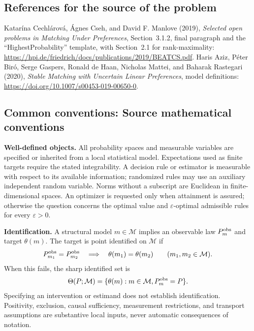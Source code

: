 \documentclass[11pt,a4paper]{article}
\begin{document}
\subsection*{References for the source of the problem}
Katar\'ina Cechl\'arov\'a, \'Agnes Cseh, and David F. Manlove (2019), \emph{Selected open problems in Matching Under Preferences}, Section~3.1.2, final paragraph and the ``HighestProbability'' template, with Section~2.1 for rank-maximality: \url{https://hpi.de/friedrich/docs/publications/2019/BEATCS.pdf}. Haris Aziz, P\'eter Bir\'o, Serge Gaspers, Ronald de Haan, Nicholas Mattei, and Baharak Rastegari (2020), \emph{Stable Matching with Uncertain Linear Preferences}, model definitions: \url{https://doi.org/10.1007/s00453-019-00650-0}.

\subsection*{Common conventions: Source mathematical conventions}

\textbf{Well-defined objects.}
All probability spaces and measurable variables are specified or inherited
from a local statistical model. Expectations used as finite targets require
the stated integrability. A decision rule or estimator is measurable with
respect to its available information; randomized rules may use an auxiliary
independent random variable. Norms without a subscript are Euclidean in
finite-dimensional spaces. An optimizer is requested only when attainment
is assured; otherwise the question concerns the optimal value and
$\varepsilon$-optimal admissible rules for every $\varepsilon>0$.

\textbf{Identification.}
A structural model $m\in\mathcal M$ implies an observable law
$P_m^{\rm obs}$ and target $\theta(m)$. The target is point identified on
$\mathcal M$ if
\[
 P_{m_1}^{\rm obs}=P_{m_2}^{\rm obs}
 \quad\Longrightarrow\quad\theta(m_1)=\theta(m_2)
 \qquad(m_1,m_2\in\mathcal M).
\]
When this fails, the sharp identified set is
\[
 \Theta(P;\mathcal M)=\{\theta(m):m\in\mathcal M,
                                  P_m^{\rm obs}=P\}.
\]
Specifying an intervention or estimand does not establish identification.
Positivity, exclusion, causal sufficiency, measurement restrictions, and
transport assumptions are substantive local inputs, never automatic
consequences of notation.
\end{document}
